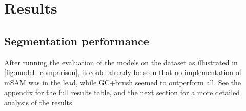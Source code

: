\chapter{Results}
\section{Segmentation performance}

After running the evaluation of the models on the dataset as illustrated in \cref{fig:model_comparison}, it could already be seen that no implementation of \acf{mSAM} was in the lead, while \acs{GC+brush} seemed to outperform all.
See the appendix for the full results table, and the next section for a more detailed analysis of the results.

\resumetable
{}\shapirotable
{}\ttable

\of\shapirotable
\edef\ShapiroPValueResidualGrabCutSam{\pgfplotsretval}

\of\ttable
\edef\ttestpvalueGCmSAM{\pgfplotsretval}

\of\ttable
\edef\tteststatGCmSAM{\pgfplotsretval}

\of\resumetable
\edef\GCbrushmean{\pgfplotsretval}

\of\resumetable
\edef\mSAMmean{\pgfplotsretval}

\pgfmathsetmacro{\deltameanGCmSAM}{\GCbrushmean - \mSAMmean}

